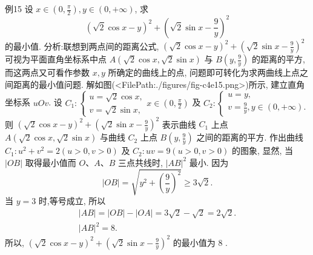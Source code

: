 例15 设 $x \in\left(0, \frac{\pi}{2}\right), y \in(0,+\infty)$, 求
$$
(\sqrt{2} \cos x-y)^2+\left(\sqrt{2} \sin x-\frac{9}{y}\right)^2
$$
的最小值.
分析:联想到两点间的距离公式, $(\sqrt{2} \cos x-y)^2+\left(\sqrt{2} \sin x-\frac{9}{y}\right)^2$ 可视为平面直角坐标系中点 $A(\sqrt{2} \cos x, \sqrt{2} \sin x)$ 与 $B\left(y, \frac{9}{y}\right)$ 的距离的平方, 而这两点又可看作参数 $x, y$ 所确定的曲线上的点, 问题即可转化为求两曲线上点之间距离的最小值问题.
解如图(<FilePath:./figures/fig-c4e15.png>)所示, 建立直角坐标系 $u O v$.
设 $C_1:\left\{\begin{array}{l}u=\sqrt{2} \cos x, \\ v=\sqrt{2} \sin x,\end{array} x \in\left(0, \frac{\pi}{2}\right)\right.$
及 $C_2:\left\{\begin{array}{l}u=y, \\ v=\frac{9}{y}, y \in(0,+\infty) .\end{array}\right.$
则 $(\sqrt{2} \cos x-y)^2+\left(\sqrt{2} \sin x-\frac{9}{y}\right)^2$ 表示曲线 $C_1$ 上点 $A(\sqrt{2} \cos x, \sqrt{2} \sin x)$ 与曲线 $C_2$ 上点 $B\left(y, \frac{9}{y}\right)$ 之间的距离的平方.
作出曲线 $C_1: u^2+v^2=2(u>0, v>0)$ 及 $C_2: u v=9(u>0, v>0)$ 的图象, 显然, 当 $|O B|$ 取得最小值而 $O 、 A 、 B$ 三点共线时, $|A B|^2$ 最小.
因为
$$
|O B|=\sqrt{y^2+\left(\frac{9}{y}\right)^2} \geqslant 3 \sqrt{2} .
$$
当 $y=3$ 时,等号成立, 所以
$$
\begin{gathered}
|A B|=|O B|-|O A|=3 \sqrt{2}-\sqrt{2}=2 \sqrt{2} . \\
|A B|^2=8 .
\end{gathered}
$$
所以, $(\sqrt{2} \cos x-y)^2+\left(\sqrt{2} \sin x-\frac{9}{y}\right)^2$ 的最小值为 8 .



